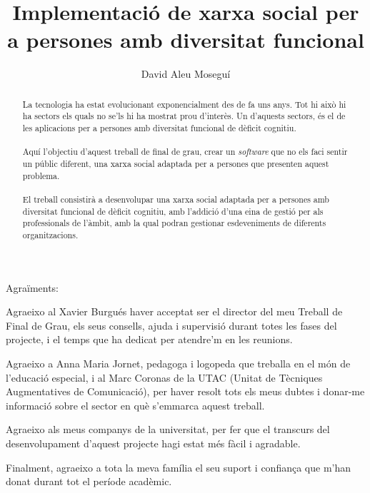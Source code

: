 \documentclass[11pt,catalan,listoffigures,listoftables]{tfgetsinf}
\title{Implementació de xarxa social per a persones amb diversitat funcional}
\author{David Aleu Moseguí}
\begin{document}
\begin{center}
\begin{LARGE}
Agraïments:
\end{LARGE}
\end{center}
\begin{center}
Agraeixo al Xavier Burgués haver acceptat ser el director del meu Treball de Final de Grau, els seus consells, ajuda i supervisió durant totes les fases del projecte, i el temps que ha dedicat per atendre'm en les reunions.
\end{center}
\begin{center}
Agraeixo a Anna Maria Jornet, pedagoga i logopeda que treballa en el món de l'educació especial, i al Marc Coronas de la UTAC (Unitat de Tècniques Augmentatives de Comunicació), per haver resolt tots els meus dubtes i donar-me informació sobre el sector en què s'emmarca aquest treball.
\end{center}
\begin{center}
Agraeixo als meus companys de la universitat, per fer que el transcurs del desenvolupament d'aquest projecte hagi estat més fàcil i agradable.
\end{center}
\begin{center}
Finalment, agraeixo a tota la meva família el seu suport i confiança que m'han donat durant tot el període acadèmic.
\end{center}
\clearpage
\begin{abstract}
\noindent La tecnologia ha estat evolucionant exponencialment des de fa uns anys. Tot hi això hi ha sectors els quals no se'ls hi ha mostrat prou d'interès. Un d'aquests sectors, és el de les aplicacions per a persones amb diversitat funcional de dèficit cognitiu.\\ \\
Aquí l'objectiu d'aquest treball de final de grau, crear un \textit{software} que no els faci sentir un públic diferent, una xarxa social adaptada per a persones que presenten aquest problema.\\ \\
El treball consistirà a desenvolupar una xarxa social adaptada per a persones amb diversitat funcional de dèficit cognitiu, amb l'addició d'una eina de gestió per als professionals de l'àmbit, amb la qual podran gestionar esdeveniments de diferents organitzacions.
\end{abstract}
\end{document}
